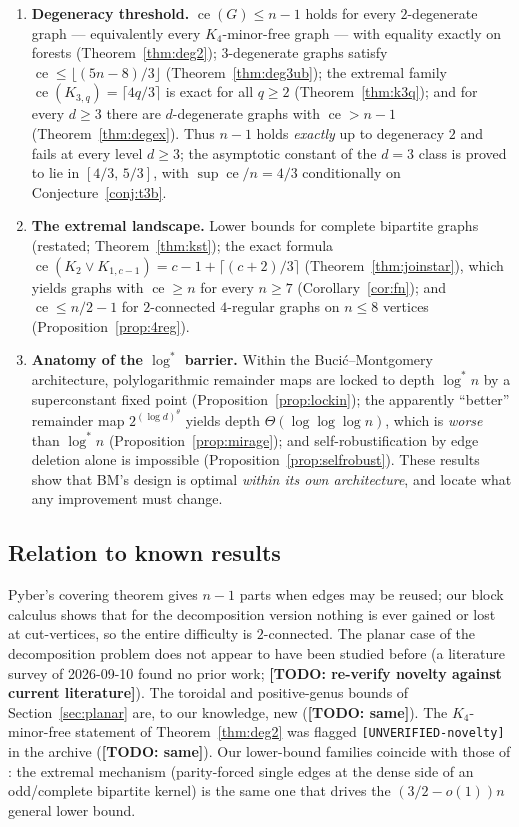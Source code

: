 \documentclass[a4paper,11pt]{amsart}
\theoremstyle{definition}
\theoremstyle{remark}
\newcommand{\ce}{\operatorname{ce}}
\newcommand{\TODO}[1]{\textbf{[TODO: #1]}}
\begin{document}
\begin{enumerate}
\item \textbf{Degeneracy threshold.} $\ce(G)\le n-1$ holds for every $2$-degenerate graph --- equivalently
every $K_4$-minor-free graph --- with equality exactly on forests (Theorem~\ref{thm:deg2}); $3$-degenerate
graphs satisfy $\ce\le\lfloor(5n-8)/3\rfloor$ (Theorem~\ref{thm:deg3ub}); the extremal family
$\ce(K_{3,q})=\lceil 4q/3\rceil$ is exact for all $q\ge2$ (Theorem~\ref{thm:k3q}); and for every $d\ge3$
there are $d$-degenerate graphs with $\ce>n-1$ (Theorem~\ref{thm:degex}). Thus $n-1$ holds \emph{exactly} up
to degeneracy $2$ and fails at every level $d\ge3$; the asymptotic constant of the $d=3$ class is proved to
lie in $[4/3,\,5/3]$, with $\sup\ce/n=4/3$ conditionally on Conjecture~\ref{conj:t3b}.
\item \textbf{The extremal landscape.} Lower bounds for complete bipartite graphs (restated;
Theorem~\ref{thm:kst}); the exact formula $\ce(K_2\vee K_{1,c-1})=c-1+\lceil(c+2)/3\rceil$
(Theorem~\ref{thm:joinstar}), which yields graphs with $\ce\ge n$ for every $n\ge 7$
(Corollary~\ref{cor:fn}); and $\ce\le n/2-1$ for $2$-connected $4$-regular graphs on $n\le8$ vertices
(Proposition~\ref{prop:4reg}).
\item \textbf{Anatomy of the $\log^*$ barrier.} Within the Buci\'c--Montgomery architecture, polylogarithmic
remainder maps are locked to depth $\log^* n$ by a superconstant fixed point
(Proposition~\ref{prop:lockin}); the apparently ``better'' remainder map $2^{(\log d)^\theta}$ yields depth
$\Theta(\log\log\log n)$, which is \emph{worse} than $\log^* n$ (Proposition~\ref{prop:mirage}); and
self-robustification by edge deletion alone is impossible (Proposition~\ref{prop:selfrobust}). These results
show that BM's design is optimal \emph{within its own architecture}, and locate what any improvement must
change.
\end{enumerate}

\subsection{Relation to known results}

Pyber's covering theorem \cite{Py85} gives $n-1$ parts when edges may be reused; our block calculus shows
that for the decomposition version nothing is ever gained or lost at cut-vertices, so the entire difficulty
is $2$-connected. The planar case of the decomposition problem does not appear to have been studied before
(a literature survey of 2026-09-10 found no prior work; \TODO{re-verify novelty against current literature}).
The toroidal and positive-genus bounds of Section~\ref{sec:planar} are, to our knowledge, new
(\TODO{same}). The $K_4$-minor-free statement of Theorem~\ref{thm:deg2} was flagged
\texttt{[UNVERIFIED-novelty]} in the archive (\TODO{same}). Our lower-bound families coincide with those of
\cite{BM22,E83}: the extremal mechanism (parity-forced single edges at the dense side of an odd/complete
bipartite kernel) is the same one that drives the $(3/2-o(1))n$ general lower bound.
\end{document}
